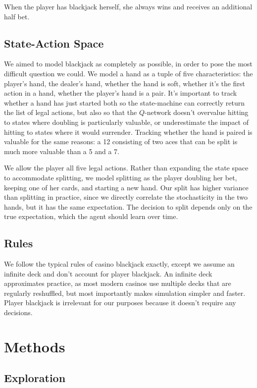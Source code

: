 \documentclass{article}
\begin{document}
When the player has blackjack herself, she always wins and receives an additional half bet. 

\subsection{State-Action Space}

We aimed to model blackjack as completely as possible, in order to pose the most difficult question we could. We model a hand as a tuple of five characteristics: the player's hand,  the dealer's hand, whether the hand is soft, whether it's the first action in a hand, whether the player's hand is a pair. It's important to track whether a hand has just started both so the state-machine can correctly return the list of legal actions, but also so that the $Q$-network doesn't overvalue hitting to states where doubling is particularly valuable, or underestimate the impact of hitting to states where it would surrender. Tracking whether the hand is paired is valuable for the same reasons: a 12 consisting of two aces that can be split is much more valuable than a 5 and a 7. 

We allow the player all five legal actions. Rather than expanding the state space to accommodate splitting, we model splitting as the player doubling her bet, keeping one of her cards, and starting a new hand. Our split has higher variance than splitting in practice, since we directly correlate the stochasticity in the two hands, but it has the same expectation. The decision to split depends only on the true expectation, which the agent should learn over time. 

\subsection{Rules}

We follow the typical rules of casino blackjack exactly, except we assume an infinite deck and don't account for player blackjack. An infinite deck approximates practice, as most modern casinos use multiple decks that are regularly reshuffled, but most importantly makes simulation simpler and faster. Player blackjack is irrelevant for our purposes because it doesn't require any decisions. 

\section{Methods}

\subsection{Exploration}
\end{document}
